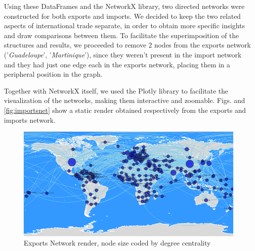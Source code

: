 \documentclass[12pt, a4paper]{article}
\begin{document}
Using these DataFrames and the NetworkX library, two directed networks were constructed for both exports and imports. We decided to keep the two related aspects of international trade separate, in order to obtain more specific insights and draw comparisons between them. To facilitate the superimposition of the structures and results, we proceeded to remove 2 nodes from the exports network ('\emph{Guadeloupe}', '\emph{Martinique}'), since they weren't present in the import network and they had just one edge each in the exports network, placing them in a peripheral position in the graph. 
\begin{table}[h]
\centering
\small
{}
\captionsetup{font=scriptsize,labelfont=bf}
\caption{Comparison of Network Statistics before and after cleaning}
\label{tab:network_stats}
\end{table}

Together with NetworkX itself, we used the Plotly library to facilitate the visualization of the networks, making them interactive and zoomable. Figs. \label{fig:exportsnet} and \ref{fig:importsnet} show a static render obtained respectively from the exports and imports network.
\begin{figure}[ht]
\centering
\includegraphics[scale=0.6]{img/exportnet.png}
\captionsetup{font=scriptsize,labelfont=bf}
\caption{Exports Network render, node size coded by degree centrality}
\label{fig:exportsnet}
\end{figure}
\end{document}
